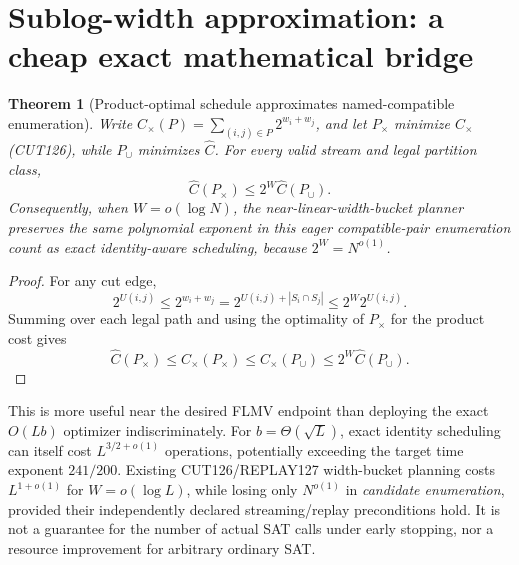 \documentclass[11pt]{article}
\newtheorem{theorem}{Theorem}
\begin{document}
\section{Sublog-width approximation: a cheap exact mathematical bridge}
\begin{theorem}[Product-optimal schedule approximates named-compatible enumeration]
Write
$C_\times(P)=\sum_{(i,j)\in P}2^{w_i+w_j}$,
and let $P_\times$ minimize $C_\times$ (CUT126), while $P_\cup$ minimizes $\widehat C$.
For \emph{every} valid stream and legal partition class,
\[
\boxed{\widehat C(P_\times)\le 2^W\widehat C(P_\cup).}
\]
Consequently, when $W=o(\log N)$, the near-linear-width-bucket planner preserves the \emph{same polynomial exponent} in this eager compatible-pair enumeration count as exact identity-aware scheduling, because $2^W=N^{o(1)}$.
\end{theorem}
\begin{proof}
For any cut edge,
\[
2^{U(i,j)}
\le 2^{w_i+w_j}
=2^{U(i,j)+|S_i\cap S_j|}
\le2^W2^{U(i,j)}.
\]
Summing over each legal path and using the optimality of $P_\times$ for the product cost gives
\[
\widehat C(P_\times)
\le C_\times(P_\times)
\le C_\times(P_\cup)
\le2^W\widehat C(P_\cup).
\]
\end{proof}
This is more useful near the desired FLMV endpoint than deploying the exact $O(Lb)$ optimizer indiscriminately. For $b=\Theta(\sqrt L)$, exact identity scheduling can itself cost $L^{3/2+o(1)}$ operations, potentially exceeding the target time exponent $241/200$. Existing CUT126/REPLAY127 width-bucket planning costs $L^{1+o(1)}$ for $W=o(\log L)$, while losing only $N^{o(1)}$ in \emph{candidate enumeration}, provided their independently declared streaming/replay preconditions hold. It is not a guarantee for the number of actual SAT calls under early stopping, nor a resource improvement for arbitrary ordinary SAT.
\end{document}

